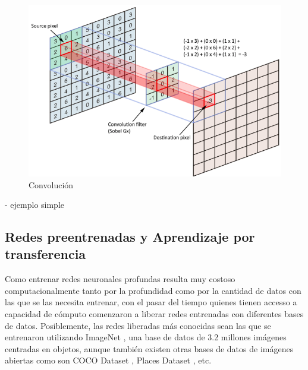 \begin{figure}
	\centering
	\includegraphics[width=0.7\linewidth]{images/convolution}
	\caption[Convolución]{Convolución}
	\label{fig:convolution}
\end{figure}

- ejemplo simple

\subsection{Redes preentrenadas y Aprendizaje por transferencia} 

Como entrenar redes neuronales profundas resulta muy costoso computacionalmente tanto por la profundidad como por la cantidad de datos con las que se las necesita entrenar, con el pasar del tiempo quienes tienen accesso a capacidad de cómputo comenzaron a liberar redes entrenadas con diferentes bases de datos. Posiblemente, las redes liberadas más conocidas sean las que se entrenaron utilizando ImageNet \cite{ImageNet}, una base de datos de 3.2 millones imágenes centradas en objetos, aunque también existen otras bases de datos de imágenes abiertas como son COCO Dataset \cite{BMVC2015_52}, Places Dataset \cite{learning_deep_features}, etc.

